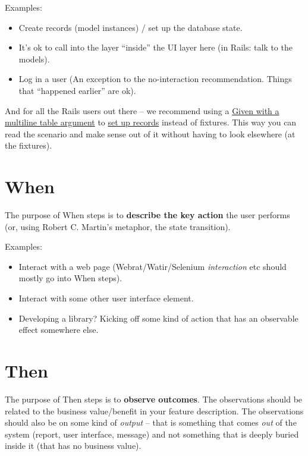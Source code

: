 \documentclass[10pt]{book}
\begin{document}
Examples:

\begin{itemize}
  \item Create records (model instances) / set up the database state.
  \item It's ok to call into the layer ``inside'' the UI layer here (in Rails: talk to the models).
  \item Log in a user (An exception to the no-interaction recommendation. Things that ``happened earlier'' are ok).
\end{itemize}

And for all the Rails users out there -- we recommend using a \href{https://github.com/aslakhellesoy/cucumber-rails-test/blob/master/features/manage_lorries.feature}{Given with a multiline table argument} to \href{https://github.com/aslakhellesoy/cucumber-rails-test/blob/master/features/step_definitions/lorry_steps.rb}{set up records} instead of fixtures. This way you can read the scenario and make sense out of it without having to look elsewhere (at the fixtures).

\section{When}

The purpose of When steps is to \textbf{describe the key action} the user performs (or, using Robert C. Martin's metaphor, the state transition).

Examples:

\begin{itemize}
  \item Interact with a web page (Webrat/Watir/Selenium \emph{interaction} etc should mostly go into When steps).
  \item Interact with some other user interface element.
  \item Developing a library? Kicking off some kind of action that has an observable effect somewhere else.
\end{itemize}

\section{Then}

The purpose of Then steps is to \textbf{observe outcomes}. The observations should be related to the business value/benefit in your feature description. The observations should also be on some kind of \emph{output} -- that is something that comes \emph{out} of the system (report, user interface, message) and not something that is deeply buried inside it (that has no business value).
\end{document}
